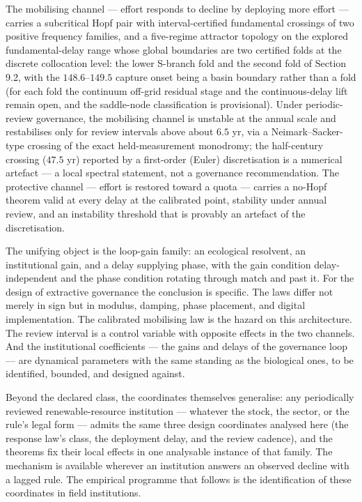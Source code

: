 \documentclass[11pt]{article}
\begin{document}
The mobilising channel --- effort responds to decline by deploying more
effort --- carries a subcritical Hopf pair with interval-certified
fundamental crossings of two positive frequency families, and a
five-regime attractor topology on the explored fundamental-delay range
whose global boundaries are two certified folds at the discrete
collocation level: the lower S-branch fold and the second fold of
Section 9.2, with the \(148.6\)--\(149.5\) capture onset being a basin
boundary rather than a fold (for each fold the continuum off-grid
residual stage and the continuous-delay lift remain open, and the
saddle-node classification is provisional). Under periodic-review
governance, the mobilising channel is unstable at the annual scale and
restabilises only for review intervals above about \(6.5\) yr, via a
Neimark--Sacker-type crossing of the exact held-measurement monodromy;
the half-century crossing (\(47.5\) yr) reported by a first-order
(Euler) discretisation is a numerical artefact --- a local spectral
statement, not a governance recommendation. The protective channel ---
effort is restored toward a quota --- carries a no-Hopf theorem valid at
every delay at the calibrated point, stability under annual review, and
an instability threshold that is provably an artefact of the
discretisation.

The unifying object is the loop-gain family: an ecological resolvent, an
institutional gain, and a delay supplying phase, with the gain condition
delay-independent and the phase condition rotating through match and
past it. For the design of extractive governance the conclusion is
specific. The laws differ not merely in sign but in modulus, damping,
phase placement, and digital implementation. The calibrated mobilising
law is the hazard on this architecture. The review interval is a control
variable with opposite effects in the two channels. And the
institutional coefficients --- the gains and delays of the governance
loop --- are dynamical parameters with the same standing as the
biological ones, to be identified, bounded, and designed against.

Beyond the declared class, the coordinates themselves generalise: any
periodically reviewed renewable-resource institution --- whatever the
stock, the sector, or the rule's legal form --- admits the same three
design coordinates analysed here (the response law's class, the
deployment delay, and the review cadence), and the theorems fix their
local effects in one analysable instance of that family. The mechanism
is available wherever an institution answers an observed decline with a
lagged rule. The empirical programme that follows is the identification
of these coordinates in field institutions.
\end{document}
